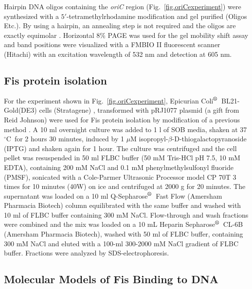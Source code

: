 \documentclass[doublespacing]{narfront}
\newcommand{\fig}[1]{Fig.~\ref{#1}} %
\newcommand{\degreesC}{${}^\circ \mbox{C}$}
\newcommand{\trademark}{${}^{\mbox{\scriptsize\textregistered}}$}
\begin{document}
Hairpin DNA oligos containing the
\emph{oriC} region
(\fig{fig.oriCexperiment})
were synthesized with a
$5'$-tetra\-methyl\-rhodamine modification and gel purified (Oligos Etc.).
By using a hairpin, an annealing step is not required and the
oligos are exactly equimolar
\cite{Hengen.fisinfo}.
Horizontal 8\% PAGE was used for the gel mobility shift assay and band positions
were visualized with a FMBIO II fluorescent scanner (Hitachi) with an
excitation wavelength of
532 nm and detection at 605 nm.

\subsection*{Fis protein isolation}

For the experiment shown in \fig{fig.oriCexperiment},
Epicurian Coli\trademark\
BL21-Gold(DE3) cells
(Stratagene) \cite{Studier1986},
transformed with pRJ1077 plasmid
(a gift from Reid Johnson)
were used for Fis protein isolation by modification of a previous method
\cite{Pan.Johnson1996}.
A 10 ml overnight culture was added to 1 l of SOB media, shaken at 37\degreesC\
for 2 hours 30 minutes, induced by 1 $\mu$M
isopropyl-$\beta$-D-thiogalactopyranoside
(IPTG)
and shaken again for 1 hour.  The culture was centrifuged and the cell
pellet was resuspended in 50 ml FLBC buffer (50 mM Tris-HCl pH 7.5, 10 mM
EDTA), containing 200 mM NaCl and 0.1 mM
phenylmethylsulfonyl fluoride
(PMSF), sonicated with a Cole-Parmer
Ultrasonic Processor model CP 70T 3 times for 10 minutes (40W) on ice and
centrifuged at 2000 g for 20 minutes.  The supernatant was loaded on a 10 ml
Q-Sepharose\trademark\ Fast Flow (Amersham Pharmacia Biotech) column equilibrated
with the same buffer and washed with 10 ml of FLBC buffer containing 300 mM
NaCl.  Flow-through and wash fractions were combined and the mix was loaded
on a 10 mL Heparin Sepharose\trademark\ CL-6B (Amersham Pharmacia Biotech), washed
with 50 ml of FLBC buffer, containing 300 mM NaCl and eluted with a 100-ml
300-2000 mM NaCl gradient of FLBC buffer. Fractions were analyzed by
SDS-electrophoresis.

\subsection*{Molecular Models of Fis Binding to DNA}

\end{document}
